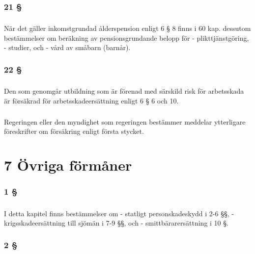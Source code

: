 \documentclass[a4paper,notitlepage,openany,10pt]{book}
\begin{document}
\subsection*{21 §}
\paragraph*{}
När det gäller inkomstgrundad ålderspension enligt 6 § 8 finns i 60 kap. dessutom bestämmelser om beräkning av pensionsgrundande belopp för
\newline - plikttjänstgöring,
\newline - studier, och
\newline - vård av småbarn (barnår).
\subsection*{22 §}
\paragraph*{}
Den som genomgår utbildning som är förenad med särskild risk för arbetsskada är försäkrad för arbetsskadeersättning enligt 6 § 6 och 10.
\paragraph*{}
Regeringen eller den myndighet som regeringen bestämmer meddelar ytterligare föreskrifter om försäkring enligt första stycket.
\chapter*{7 Övriga förmåner}
\subsection*{1 §}
\paragraph*{}
I detta kapitel finns bestämmelser om
\newline - statligt personskadeskydd i 2-6 §§,
\newline - krigsskadeersättning till sjömän i 7-9 §§, och
\newline - smittbärarersättning i 10 §.
\subsection*{2 §}
\end{document}
